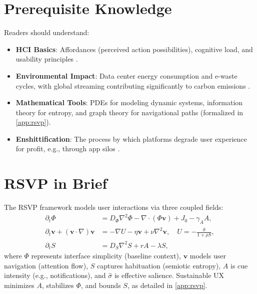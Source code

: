 \documentclass[openany]{book}
\newcommand{\PhiS}{\Phi} %
\newcommand{\vvec}{\mathbf{v}} %
\newcommand{\Sent}{S} %
\begin{document}
\section{Prerequisite Knowledge}
Readers should understand:
\begin{itemize}
  \item \textbf{HCI Basics}: Affordances (perceived action possibilities), cognitive load, and usability principles \citep{norman1988}.
  \item \textbf{Environmental Impact}: Data center energy consumption and e-waste cycles, with global streaming contributing significantly to carbon emissions \citep{extentia2024}.
  \item \textbf{Mathematical Tools}: PDEs for modeling dynamic systems, information theory for entropy, and graph theory for navigational paths (formalized in \cref{app:rsvp}).
  \item \textbf{Enshittification}: The process by which platforms degrade user experience for profit, e.g., through app silos \citep{doctorow2022}.
\end{itemize}

\section{RSVP in Brief}
\label{sec:intro-rsvp}
The RSVP framework models user interactions via three coupled fields:
\begin{align}
\partial_t \PhiS &= D_\Phi \nabla^2 \PhiS - \nabla \cdot (\PhiS \vvec) + J_0 - \gamma_A A, \label{eq:intro-phi} \\
\partial_t \vvec + (\vvec \cdot \nabla)\vvec &= -\nabla U - \eta \vvec + \nu \nabla^2 \vvec, \quad U = -\frac{\widehat{\sigma}}{1 + \rho \Sent}, \label{eq:intro-v} \\
\partial_t \Sent &= D_S \nabla^2 \Sent + r A - \lambda \Sent, \label{eq:intro-S}
\end{align}
where \(\PhiS\) represents interface simplicity (baseline context), \(\vvec\) models user navigation (attention flow), \(\Sent\) captures habituation (semiotic entropy), \(A\) is cue intensity (e.g., notifications), and \(\widehat{\sigma}\) is effective salience. Sustainable UX minimizes \(A\), stabilizes \(\PhiS\), and bounds \(\Sent\), as detailed in \cref{app:rsvp}.
\end{document}
